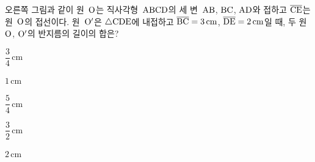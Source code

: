 \noindent\begin{minipage}[t]{0.58\linewidth}\vspace{0pt}\raggedright 오른쪽 그림과 같이 원~$\mathrm{O}$는 직사각형~$\mathrm{ABCD}$의 세 변~$\mathrm{AB}$, $\mathrm{BC}$, $\mathrm{AD}$와 접하고 $\overline{\mathrm{CE}}$는 원~$\mathrm{O}$의 접선이다. 원~$\mathrm{O'}$은 $\triangle\mathrm{CDE}$에 내접하고 $\overline{\mathrm{BC}}=3\,\mathrm{cm}$, $\overline{\mathrm{DE}}=2\,\mathrm{cm}$일 때, 두 원~$\mathrm{O}$, $\mathrm{O'}$의 반지름의 길이의 합은?\end{minipage}\hfill\begin{minipage}[t]{0.4\linewidth}\vspace{0pt}\centering \resizebox{\ifdim\width>\linewidth\linewidth\else\width\fi}{!}{}\end{minipage}\par
\begin{choices32}{\rule[-3ex]{0pt}{8ex}$\dfrac{3}{4}\,\mathrm{cm}$}{\rule[-3ex]{0pt}{8ex}$1\,\mathrm{cm}$}{\rule[-3ex]{0pt}{8ex}$\dfrac{5}{4}\,\mathrm{cm}$}{\rule[-3ex]{0pt}{8ex}$\dfrac{3}{2}\,\mathrm{cm}$}{\rule[-3ex]{0pt}{8ex}$2\,\mathrm{cm}$}\end{choices32}
